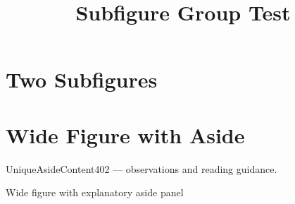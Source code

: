 \documentclass{SUSTechHomework}
\title{Subfigure Group Test}
\begin{document}
\maketitle

\section{Two Subfigures}

\begin{sustechfiguregroup}
  \begin{sustechsubfigure}
    \sustechplaceholdergraphic[0.92\linewidth][3cm]
  \end{sustechsubfigure}
  \sustechfloatsep
  \begin{sustechsubfigure}
    \sustechplaceholdergraphic[0.92\linewidth][3cm]
  \end{sustechsubfigure}
  \caption{Two subfigures in one grouped figure — UniqueSubfigGroup401}
\end{sustechfiguregroup}

\section{Wide Figure with Aside}

\sustechfigurewithaside
  {\sustechplaceholdergraphic[0.95\linewidth][4cm]}
  {
    \begin{sustechaside}
    \small
    UniqueAsideContent402 — observations and reading guidance.
    \end{sustechaside}
  }
  {Wide figure with explanatory aside panel}
\end{document}
